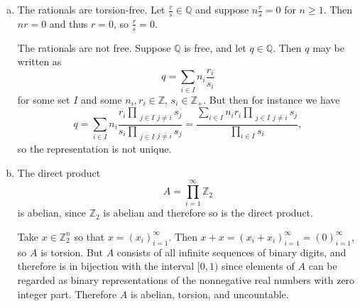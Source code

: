 \documentclass{article}
\begin{document}
\begin{Answer}
\begin{enumerate}[(a)]
{  }
  \item{
    The rationals are torsion-free. Let $\frac{r}{s} \in
    \mathbb{Q}$ and suppose $n \frac{r}{s} = 0$ for $n \geq 1$.
    Then $n r = 0$ and thus $r = 0$, so $\frac{r}{s} = 0$.

    The rationals are not free. Suppose $\mathbb{Q}$ is free, and let
    $q \in \mathbb{Q}$. Then $q$ may be written as
    $$
    q = \sum_{i \in I} n_i \frac{r_i}{s_i}
    $$
    for some set $I$ and some $n_i, r_i \in \mathbb{Z}$, $s_i \in \mathbb{Z}_+$. But then
    for instance we have
    $$
    q
      = \sum_{i \in I} n_i
          \frac{r_i\prod_{\substack{j \in I}{j \neq i}} s_j}
               {s_i \prod_{\substack{j \in I}{j \neq i}} s_j}
      = \frac{\sum_{i \in I} n_i r_i
                \prod_{\substack{j \in I}{j \neq i}} s_j}
             {\prod_{i \in I} s_i},
    $$
    so the representation is not unique.
%
%
  }
  \item{
    The direct product
    $$
    A = \prod_{i=1}^\infty \mathbb{Z}_2
    $$
    is abelian, since $\mathbb{Z}_2$ is abelian and therefore so is
    the direct product.

    Take $x \in \mathbb{Z}_2^n$ so that $x = (x_i)_{i=1}^\infty$. Then
    $x + x = (x_i + x_i)_{i=1}^\infty = (0)_{i=1}^\infty$, so $A$ is torsion.
    But $A$ consists of all infinite sequences of binary digits, and
    therefore is in bijection with the interval $[0, 1)$ since
    elements of $A$ can be regarded as binary representations of the
    nonnegative real numbers with zero integer part.
    Therefore $A$ is abelian, torsion, and uncountable.
  }
\end{enumerate}
\end{Answer}

\pagebreak
\end{document}
